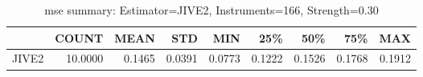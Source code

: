 \begin{table}[ht]
\centering
\caption{mse summary: Estimator=JIVE2, Instruments=166, Strength=0.30}
\begin{tabular}{lrrrrrrrr}
\toprule
 & COUNT & MEAN & STD & MIN & 25\% & 50\% & 75\% & MAX \\
\midrule
JIVE2 & 10.0000 & 0.1465 & 0.0391 & 0.0773 & 0.1222 & 0.1526 & 0.1768 & 0.1912 \\
\bottomrule
\end{tabular}
\end{table}
